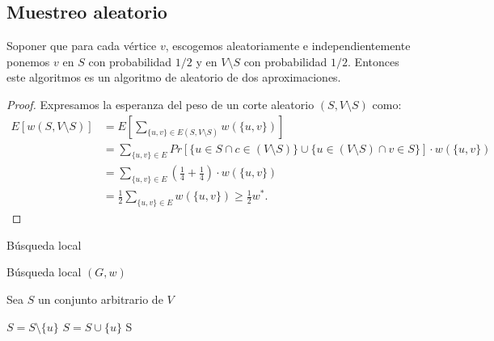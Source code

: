 \documentclass[letterpaper]{article}
\begin{document}
\begin{figure}[!h]
\begin{minipage}[t]{4cm}
	\end{minipage}
\end{figure}

\subsection{Muestreo aleatorio}
Soponer que para cada vértice $v$, escogemos aleatoriamente e independientemente ponemos $v$ en $S$
con probabilidad $1/2$ y en $V \setminus S$ con probabilidad $1/2$. Entonces este algoritmos es un
algoritmo de aleatorio de dos aproximaciones.
\begin{proof}
    Expresamos la esperanza del peso de un corte aleatorio $(S, V \setminus S)$ como:
    \begin{align*}
        E[w(S, V \setminus S)]
            &= E[ \sum_{\{ u,v \} \in E(S, V\setminus S)} w(\{ u,v \}) ]\\
            &= \sum_{\{ u,v \} \in E} Pr[ \{ u \in S \cap c \in (V \setminus S) \} \cup
                \{ u \in (V \setminus S) \cap v \in S \} ] \cdot w(\{ u,v \})\\
            &= \sum_{\{ u,v \} \in E} (\frac{1}{4} + \frac{1}{4}) \cdot w(\{ u,v \})\\
            &= \frac{1}{2} \sum_{\{ u,v \} \in E} w( \{ u,v \} ) \geq \frac{1}{2} w^*.
    \end{align*}
\end{proof}

Búsqueda local
\lstset{language=Pascal}

\begin{algorithm}[H]
    \caption{Búsqueda local $(G,w)$}
    Sea $S$ un conjunto arbitrario de $V$
    \begin{algorithmic}
    \STATE $S=S \setminus \{u\}$
    \ENDIF
    \STATE $S=S \cup \{u\}$
    \ENDIF
    \ENDWHILE
    \RETURN S
    \end{algorithmic}
\end{algorithm}
\end{document}
